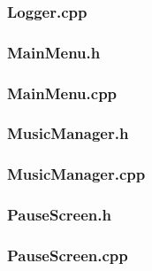\documentclass{article}
\begin{document}
\subsubsection{Logger.cpp}
	
	 				
\subsubsection{MainMenu.h}
	

\subsubsection{MainMenu.cpp}
		 
 				
\subsubsection{MusicManager.h}
	
	 				
\subsubsection{MusicManager.cpp}
	
	 				
\subsubsection{PauseScreen.h}
	 
	 				
\subsubsection{PauseScreen.cpp}	
	 
	 				
\end{document}
